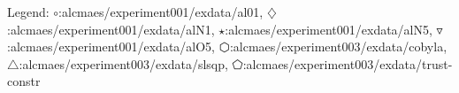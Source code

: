 Legend: {\color{NavyBlue}$\circ$}:alcmaes/experiment001/exdata/al01, {\color{Magenta}$\diamondsuit$}:alcmaes/experiment001/exdata/alN1, {\color{Orange}$\star$}:alcmaes/experiment001/exdata/alN5, {\color{CornflowerBlue}$\triangledown$}:alcmaes/experiment001/exdata/alO5, {\color{red}$\varhexagon$}:alcmaes/experiment003/exdata/cobyla, {\color{YellowGreen}$\triangle$}:alcmaes/experiment003/exdata/slsqp, {\color{cyan}$\pentagon$}:alcmaes/experiment003/exdata/trust-constr